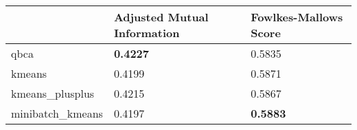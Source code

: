 \begin{table}[htbp]
\centering
\begin{tabular}{lll}
\toprule
 & Adjusted Mutual Information & Fowlkes-Mallows Score \\
\midrule
qbca & \textbf{0.4227} & 0.5835 \\
kmeans & 0.4199 & 0.5871 \\
kmeans_plusplus & 0.4215 & 0.5867 \\
minibatch_kmeans & 0.4197 & \textbf{0.5883} \\
\bottomrule
\end{tabular}
\end{table}
